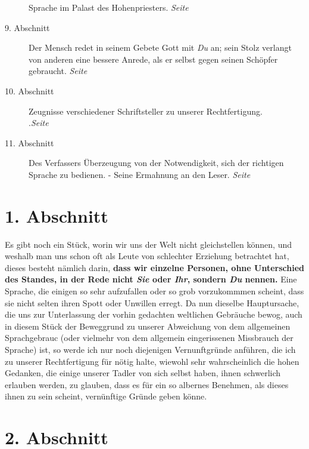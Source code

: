 \begin{description}
Sprache im Palast des Hohenpriesters.
\dotfill \textit{Seite~\pageref{kap10_ab8}}\\
\item[9. Abschnitt] Der Mensch redet in seinem Gebete Gott mit \textit{Du} an;
sein
Stolz verlangt von anderen eine bessere Anrede, als er selbst gegen seinen
Schöpfer gebraucht.
\dotfill \textit{Seite~\pageref{kap10_ab9}}\\
\item[10. Abschnitt] Zeugnisse verschiedener Schriftsteller zu unserer
Rechtfertigung.\\
.\dotfill \textit{Seite~\pageref{kap10_ab10}}\\
\item[11. Abschnitt] Des Verfassers Überzeugung von der Notwendigkeit, sich
der richtigen Sprache zu bedienen. - Seine Ermahnung an den Leser.
\dotfill \textit{Seite~\pageref{kap10_ab11}}

\end{description}

\newpage

\section{1. Abschnitt} \label{kap10_ab1}

Es gibt noch ein Stück, worin wir uns der Welt nicht
gleichstellen können, und
weshalb man uns schon oft als Leute von schlechter Erziehung betrachtet hat,
dieses besteht nämlich darin, \textbf{dass wir einzelne
Personen, ohne Unterschied des
Standes, in der Rede nicht \textit{Sie} oder \textit{Ihr}, sondern \textit{Du}
nennen.} Eine
Sprache, die einigen so sehr aufzufallen oder so grob vorzukommmen scheint, dass
sie nicht selten ihren Spott oder Unwillen erregt. Da nun dieselbe Hauptursache,
die uns zur Unterlassung der vorhin gedachten weltlichen Gebräuche bewog, auch
in diesem Stück der Beweggrund zu unserer Abweichung von dem allgemeinen
Sprachgebrauc (oder vielmehr von dem allgemein eingerissenen Missbrauch der
Sprache) ist, so werde ich nur noch diejenigen Vernunftgründe anführen, die ich
zu unserer Rechtfertigung für nötig halte, wiewohl sehr wahrscheinlich die
hohen Gedanken, die einige unserer Tadler von sich selbst haben, ihnen
schwerlich erlauben werden, zu glauben, dass es für ein so albernes Benehmen,
als
dieses ihnen zu sein scheint, vernünftige Gründe geben könne.

\section{2. Abschnitt} \label{kap10_ab2}

